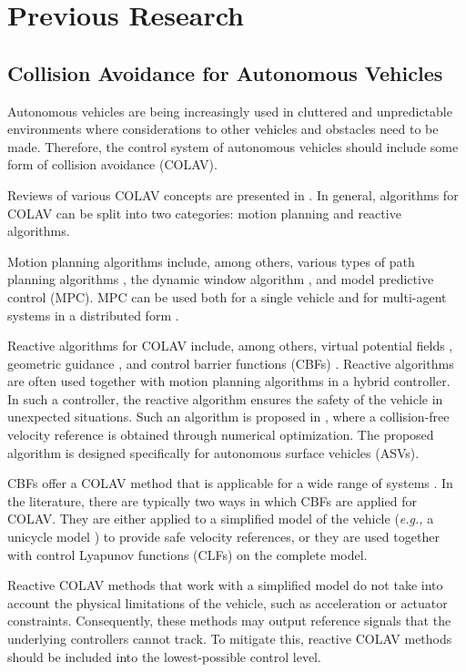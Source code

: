 \section{Previous Research}

\subsection{Collision Avoidance for Autonomous Vehicles}
Autonomous vehicles are being increasingly used in cluttered and unpredictable environments where considerations to other vehicles and obstacles need to be made. 
Therefore, the control system of autonomous vehicles should include some form of collision avoidance (COLAV).

Reviews of various COLAV concepts are presented in \cite{statheros_autonomous_2008,tam_review_2009,hoy_algorithms_2015}.
In general, algorithms for COLAV can be split into two categories: motion planning and reactive algorithms.

Motion planning algorithms include, among others, various types of path planning algorithms \cite{wang_ship_2017,kuwata_safe_2014,lazarowska_ships_2015}, the dynamic window algorithm \cite{fox_dynamic_1997}, and model predictive control (MPC).
MPC can be used both for a single vehicle \cite{hagen_mpc-based_2018,sun_collision_2018} and for multi-agent systems in a distributed form \cite{kuriki_formation_2015,dai_distributed_2017}.

Reactive algorithms for COLAV include, among others, virtual potential fields \cite{roussos_3d_2008}, geometric guidance \cite{mujumdar_reactive_2011}, and control barrier functions (CBFs) \cite{squires_constructive_2018,igarashi_collision_2018,romdlony_stabilization_2016,basso_safety-critical_2020,ames_control_2014}.
Reactive algorithms are often used together with motion planning algorithms in a hybrid controller.
In such a controller, the reactive algorithm ensures the safety of the vehicle in unexpected situations.
Such an algorithm is proposed in \cite{hedjar_automatic_2019}, where a collision-free velocity reference is obtained through numerical optimization.
The proposed algorithm is designed specifically for autonomous surface vehicles (ASVs).

CBFs offer a COLAV method that is applicable for a wide range of systems \cite{ames_control_2019}.
In the literature, there are typically two ways in which CBFs are applied for COLAV.
They are either applied to a simplified model of the vehicle (\emph{e.g.,} a unicycle model \cite{squires_constructive_2018,igarashi_collision_2018}) to provide safe velocity references, or they are used together with control Lyapunov functions (CLFs) \cite{romdlony_stabilization_2016,basso_safety-critical_2020,ames_control_2014} on the complete model.

Reactive COLAV methods that work with a simplified model do not take into account the physical limitations of the vehicle, such as acceleration or actuator constraints.
Consequently, these methods may output reference signals that the underlying controllers cannot track.
To mitigate this, reactive COLAV methods should be included into the lowest-possible control level.